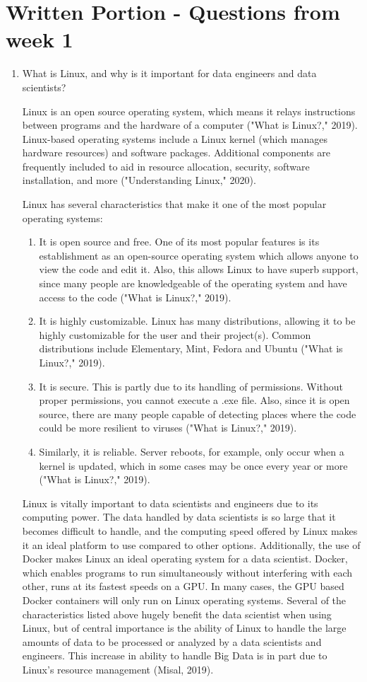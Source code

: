 \documentclass[]{article}
\begin{document}
\section{Written Portion - Questions from week 1}
\begin{enumerate}
\item What is Linux, and why is it important for data engineers and data scientists?

Linux is an open source operating system, which means it relays instructions between programs and the hardware of a computer ("What is Linux?," 2019).  Linux-based operating systems include a Linux kernel (which manages hardware resources) and software packages.  Additional components are frequently included to aid in resource allocation, security, software installation, and more ("Understanding Linux," 2020).  

Linux has several characteristics that make it one of the most popular operating systems: 
\begin{enumerate}
\item It is open source and free.  One of its most popular features is its establishment as an open-source operating system which allows anyone to view the code and edit it.  Also, this allows Linux to have superb support, since many people are knowledgeable of the operating system and have access to the code ("What is Linux?," 2019).
\item It is highly customizable. Linux has many distributions, allowing it to be highly customizable for the user and their project(s). Common distributions include Elementary, Mint, Fedora and Ubuntu ("What is Linux?," 2019).
\item It is secure.  This is partly due to its handling of permissions.  Without proper permissions, you cannot execute a .exe file.  Also, since it is open source, there are many people capable of detecting places where the code could be more resilient to viruses ("What is Linux?," 2019).
\item Similarly, it is reliable. Server reboots, for example, only occur when a kernel is updated, which in some cases may be once every year or more ("What is Linux?," 2019).
\end{enumerate}

Linux is vitally important to data scientists and engineers due to its computing power.  The data handled by data scientists is so large that it becomes difficult to handle, and the computing speed offered by Linux makes it an ideal platform to use compared to other options.  Additionally, the use of Docker makes Linux an ideal operating system for a data scientist.  Docker, which enables programs to run simultaneously without interfering with each other, runs at its fastest speeds on a GPU.  In many cases, the GPU based Docker containers will only run on Linux operating systems.  Several of the characteristics listed above hugely benefit the data scientist when using Linux, but of central importance is the ability of Linux to handle the large amounts of data to be processed or analyzed by a data scientists and engineers.  This increase in ability to handle Big Data is in part due to Linux's resource management (Misal, 2019).


\end{enumerate}
\end{document}
